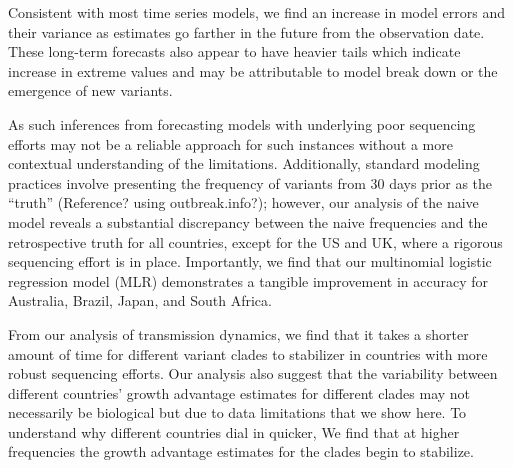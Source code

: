 \documentclass[11pt,oneside,letterpaper]{article}
\begin{document}
Consistent with most time series models, we find an increase in model errors and their variance as estimates go farther in the future from the observation date.
These long-term forecasts also appear to have heavier tails which indicate increase in extreme values and may be attributable to model break down or the emergence of new variants.  

%



As such inferences from forecasting models with underlying poor sequencing efforts may not be a reliable approach for such instances without a more contextual understanding of the limitations.
Additionally, standard modeling practices involve presenting the frequency of variants from 30 days prior as the ``truth'' (Reference? using outbreak.info?); however, our analysis of the naive model reveals a substantial discrepancy between the naive frequencies and the retrospective truth for all countries, except for the US and UK, where a rigorous sequencing effort is in place. 
Importantly, we find that our multinomial logistic regression model (MLR) demonstrates a tangible improvement in accuracy for Australia, Brazil, Japan, and South Africa.


From our analysis of transmission dynamics, we find that it takes a shorter amount of time for different variant clades to stabilizer in countries with more robust sequencing efforts. 
Our analysis also suggest that the variability between different countries' growth advantage estimates for different clades may not necessarily be biological but due to data limitations that we show here.
To understand why different countries dial in quicker, We find that at higher frequencies the growth advantage estimates for the clades begin to stabilize. 
\end{document}
